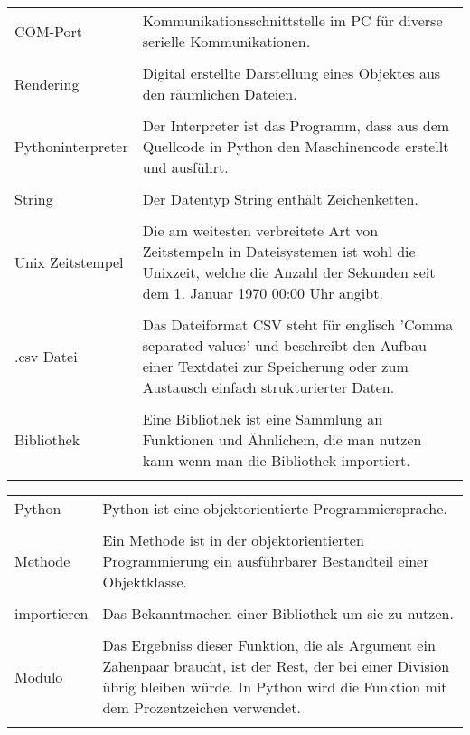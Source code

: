 \documentclass[11pt]{scrartcl}
\begin{document}
\begin{onehalfspace}
\begin{tabular}{l p{12cm}}
  COM-Port& Kommunikationsschnittstelle im PC für diverse serielle Kommunikationen.\\\\
  
 Rendering & Digital erstellte Darstellung eines Objektes aus den räumlichen Dateien.\\\\
  
Pythoninterpreter & Der Interpreter ist das Programm, dass aus dem Quellcode in Python den Maschinencode erstellt und ausführt.\\\\
  
  String& Der Datentyp String enthält Zeichenketten.\\\\
  
  Unix Zeitstempel& Die am weitesten verbreitete Art von Zeitstempeln in Dateisystemen ist wohl die Unixzeit, welche die Anzahl der Sekunden seit dem 1. Januar 1970 00:00 Uhr angibt.\\\\
  
  .csv Datei & Das Dateiformat CSV steht für englisch 'Comma separated values'  und beschreibt den Aufbau einer Textdatei zur Speicherung oder zum Austausch einfach strukturierter Daten. \\\\
  
  Bibliothek& Eine Bibliothek ist eine Sammlung an Funktionen und Ähnlichem, die man nutzen kann wenn man die Bibliothek importiert.\\\\
 \end{tabular}
 
 
 \begin{tabular}{l p{12cm}}
  
  Python & Python ist eine objektorientierte Programmiersprache.\\\\
  
  Methode& Ein Methode ist in der objektorientierten Programmierung ein ausführbarer Bestandteil einer Objektklasse.\\\\
  
  importieren& Das Bekanntmachen einer Bibliothek um sie zu nutzen.\\\\
  
  Modulo & Das Ergebniss dieser Funktion, die als Argument ein Zahenpaar braucht, ist der Rest, der bei einer Division übrig bleiben würde. In Python wird die Funktion mit dem Prozentzeichen verwendet.\\\\
  

\end{tabular}
\end{onehalfspace}
\end{document}
